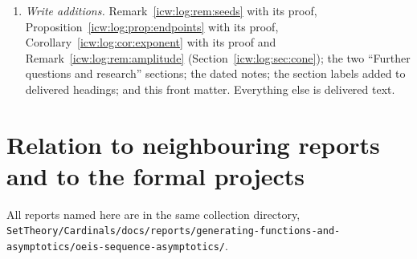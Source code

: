 \documentclass[11pt,letterpaper]{article}
\theoremstyle{remark}\newtheorem{remark}[theorem]{Remark}
\newcommand{\1}{\mathbf1}
\newcommand{\file}[1]{\textup{\nolinkurl{#1}}}
\begin{document}
\begin{enumerate}
\item \emph{Write additions.} Remark~\ref{icw:log:rem:seeds} with its proof, Proposition~\ref{icw:log:prop:endpoints} with its proof, Corollary~\ref{icw:log:cor:exponent} with its proof and Remark~\ref{icw:log:rem:amplitude} (Section~\ref{icw:log:sec:cone}); the two ``Further questions and research'' sections; the dated notes; the section labels added to delivered headings; and this front matter. Everything else is delivered text.
\end{enumerate}

\section*{Relation to neighbouring reports and to the formal projects}\label{icw:sec:neighbours}
All reports named here are in the same collection directory, \file{SetTheory/Cardinals/docs/reports/generating-functions-and-asymptotics/oeis-sequence-asymptotics/}.
\end{document}
